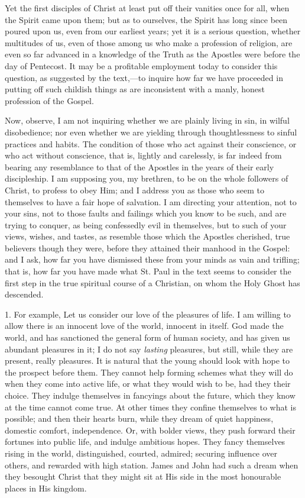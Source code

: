 Yet the first disciples of Christ at least put off
their vanities once for all, when the Spirit came upon
them; but as to ourselves, the Spirit has long since been
poured upon us, even from our earliest years; yet it is a
serious question, whether multitudes of us, even of those
among us who make a profession of religion, are even so
far advanced in a knowledge of the Truth as the Apostles
were before the day of Pentecost. It may be a profitable
employment today to consider this question, as suggested
by the text,—to inquire how far we have proceeded in
putting off such childish things as are inconsistent with
a manly, honest profession of the Gospel.

Now, observe, I am not inquiring whether we are
plainly living in sin, in wilful disobedience; nor even
whether we are yielding through thoughtlessness to sinful
practices and habits. The condition of those who act
against their conscience, or who act without conscience,
that is, lightly and carelessly, is far indeed from
bearing any resemblance to that of the Apostles in the
years of their early discipleship. I am supposing you, my
brethren, to be on the whole followers of Christ, to
profess to obey Him; and I address you as those who seem
to themselves to have a fair hope of salvation. I am
directing your attention, not to your sins, not to those
faults and failings which you know to be such, and are
trying to conquer, as being confessedly evil in
themselves, but to such of your views, wishes, and
tastes, as resemble those which the Apostles cherished,
true believers though they were, before they attained
their manhood in the Gospel: and I ask, how far you have
dismissed these from your minds as vain and trifling;
that is, how far you have made what St. Paul in the text
seems to consider the first step in the true spiritual course of a Christian, on whom the Holy Ghost has
descended.

1. For example, Let us consider our love of the
pleasures of life. I am willing to allow there is an
innocent love of the world, innocent in itself. God made
the world, and has sanctioned the general form of human
society, and has given us abundant pleasures in it; I do
not say \emph{lasting} pleasures, but still, while they
are present, really pleasures. It is natural that the
young should look with hope to the prospect before them.
They cannot help forming schemes what they will do when
they come into active life, or what they would wish to
be, had they their choice. They indulge themselves in
fancyings about the future, which they know at the time
cannot come true. At other times they confine themselves
to what is possible; and then their hearts burn, while
they dream of quiet happiness, domestic comfort,
independence. Or, with bolder views, they push forward
their fortunes into public life, and indulge ambitious
hopes. They fancy themselves rising in the world,
distinguished, courted, admired; securing influence over
others, and rewarded with high station. James and John
had such a dream when they besought Christ that they
might sit at His side in the most honourable places in
His kingdom.

